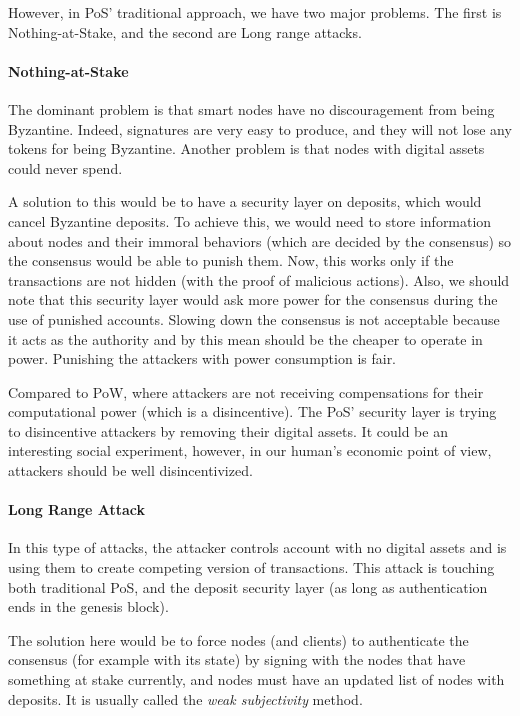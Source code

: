 However, in PoS' traditional approach, we have two major problems. The first is Nothing-at-Stake, and the second are Long range attacks.

\paragraph{Nothing-at-Stake}
The dominant problem is that smart nodes have no discouragement from being Byzantine\cite{Lamport1982TheProblem}. Indeed, signatures are very easy to produce, and they will not lose any tokens for being Byzantine. Another problem is that nodes with digital assets could never spend.

A solution to this would be to have a security layer on deposits, which would cancel Byzantine deposits. To achieve this, we would need to store information about nodes and their immoral behaviors (which are decided by the consensus) so the consensus would be able to punish them. Now, this works only if the transactions are not hidden (with the proof of malicious actions). Also, we should note that this security layer would ask more power for the consensus during the use of punished accounts. Slowing down the consensus is not acceptable because it acts as the authority and by this mean should be the cheaper to operate in power. Punishing the attackers with power consumption is fair.

Compared to PoW, where attackers are not receiving compensations for their computational power (which is a disincentive). The PoS' security layer is trying to disincentive attackers by removing their digital assets. It could be an interesting social experiment, however, in our human's economic point of view, attackers should be well disincentivized.  

\paragraph{Long Range Attack}
In this type of attacks, the attacker controls account with no digital assets and is using them to create competing version of transactions. This attack is touching both traditional PoS, and the deposit security layer (as long as authentication ends in the genesis block).

The solution here would be to force nodes (and clients) to authenticate the consensus (for example with its state) by signing with the nodes that have something at stake currently, and nodes must have an updated list of nodes with deposits. It is usually called the \textit{weak subjectivity} method.

